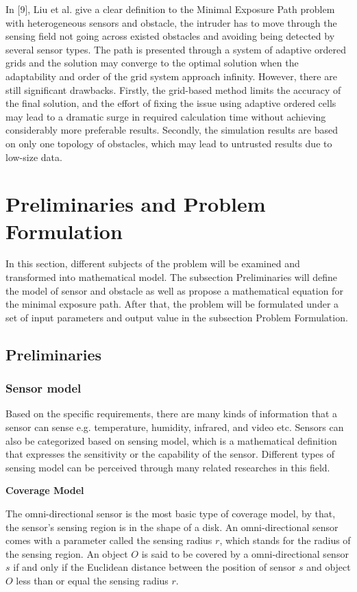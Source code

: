 \documentclass[final]{elsarticle}
\begin{document}
In [9], Liu et al. give a clear definition to the Minimal Exposure Path problem with heterogeneous sensors and obstacle, the intruder has to move through the sensing field not going across existed obstacles and avoiding being detected by several sensor types. The path is presented through a system of adaptive ordered grids and the solution may converge to the optimal solution when the adaptability and order of the grid system approach infinity. However, there are still significant drawbacks. Firstly, the grid-based method limits the accuracy of the final solution, and the effort of fixing the issue using adaptive ordered cells may lead to a dramatic surge in required calculation time without achieving considerably more preferable results. Secondly, the simulation results are based on only one topology of obstacles, which may lead to untrusted results due to low-size data.

\section{Preliminaries and Problem Formulation}

In this section, different subjects of the problem will be examined and transformed into mathematical model. The subsection Preliminaries will define the model of sensor and obstacle as well as propose a mathematical equation for the minimal exposure path. After that, the problem will be formulated under a set of input parameters and output value in the subsection Problem Formulation.

\subsection{Preliminaries}

\subsubsection{Sensor model}

Based on the specific requirements, there are many kinds of information that a sensor can sense e.g. temperature, humidity, infrared, and video etc. Sensors can also be categorized based on sensing model, which is a mathematical definition that expresses the sensitivity or the capability of the sensor. Different types of sensing model can be perceived through many related researches in this field.

\textbf{Coverage Model}

The omni-directional sensor is the most basic type of coverage model, by that, the sensor's sensing region is in the shape of a disk. An omni-directional sensor comes with a parameter called the sensing radius $r$, which stands for the radius of the sensing region. An object $ O $ is said to be covered by a omni-directional sensor $ s $ if and only if the Euclidean distance between the position of sensor $s$ and object $ O $ less than or equal the sensing radius $r$.
\end{document}
